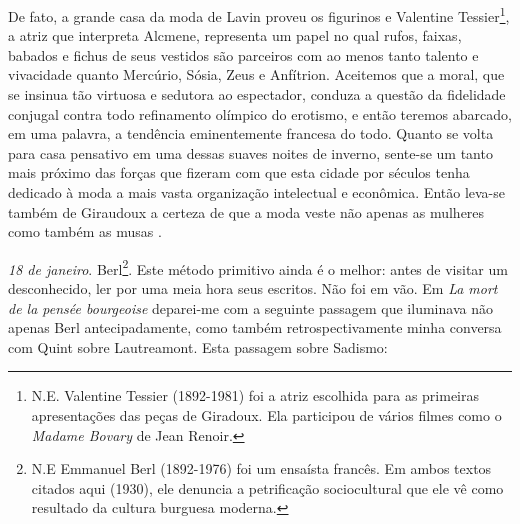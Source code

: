 De fato, a grande casa da moda de Lavin proveu os figurinos e Valentine
Tessier\footnote{N.E. Valentine Tessier (1892-1981) foi a atriz
  escolhida para as primeiras apresentações das peças de Giradoux. Ela
  participou de vários filmes como o \emph{Madame Bovary} de Jean
  Renoir.}, a atriz que interpreta Alcmene, representa um papel no qual
rufos, faixas, babados e fichus de seus vestidos são parceiros com ao
menos tanto talento e vivacidade quanto Mercúrio, Sósia, Zeus e
Anfítrion. Aceitemos que a moral, que se insinua tão virtuosa e sedutora
ao espectador, conduza a questão da fidelidade conjugal contra todo
refinamento olímpico do erotismo, e então teremos abarcado, em uma
palavra, a tendência eminentemente francesa do todo. Quanto se volta
para casa pensativo em uma dessas suaves noites de inverno, sente-se um
tanto mais próximo das forças que fizeram com que esta cidade por
séculos tenha dedicado à moda a mais vasta organização intelectual e
econômica. Então leva-se também de Giraudoux a certeza de que a moda
veste não apenas as mulheres como também as musas .

\emph{18 de janeiro}. Berl\footnote{N.E Emmanuel Berl (1892-1976) foi um
  ensaísta francês. Em ambos textos citados aqui (1930), ele denuncia a
  petrificação sociocultural que ele vê como resultado da cultura
  burguesa moderna.}. Este método primitivo ainda é o melhor: antes de
visitar um desconhecido, ler por uma meia hora seus escritos. Não foi em
vão. Em \emph{La mort de la pensée bourgeoise} deparei-me com a seguinte
passagem que iluminava não apenas Berl antecipadamente, como também
retrospectivamente minha conversa com Quint sobre Lautreamont. Esta
passagem sobre Sadismo:

